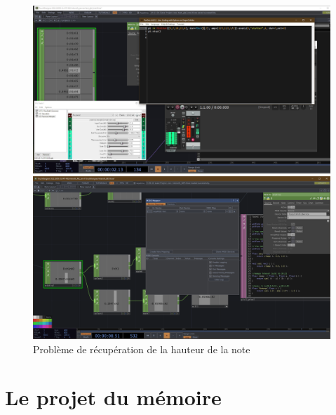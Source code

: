 \begin{figure}[h]
  \begin{minipage}[b]{0.45\linewidth}
    \centering
    \includegraphics[width=\linewidth]{images/experiments/intensifs/intensifs04.png} 
  \end{minipage}
  \hspace{0.1\linewidth} %
  \begin{minipage}[b]{0.45\linewidth}
    \centering
    \includegraphics[width=\linewidth]{images/experiments/intensifs/intensifs19.png}
  \end{minipage}
   \caption{Problème de récupération de la hauteur de la note}
   \label{intensifs04}
\end{figure}


\newpage
\section{Le projet du mémoire}

